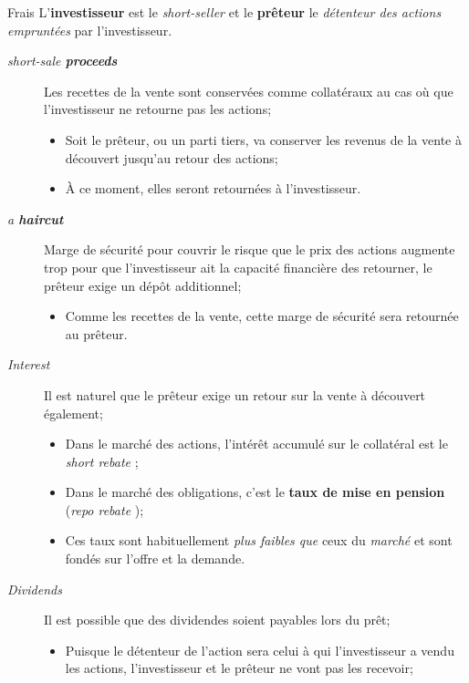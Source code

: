 \documentclass[10pt, french]{article}
\begin{document}
\begin{multicols*}{2}
\begin{conceptgen}{Frais}
L'\textbf{investisseur} est le \textit{short-seller} et le \textbf{prêteur} le \textit{détenteur des actions empruntées} par l'investisseur.

\begin{description}
	\item[\og \textit{short-sale \textbf{proceeds}} \fg{}]	Les recettes de la vente sont conservées comme collatéraux au cas où que l'investisseur ne retourne pas les actions;
		\begin{itemize}[leftmargin = *]
		\item	Soit le prêteur, ou un parti tiers, va conserver les revenus de la vente à découvert jusqu'au retour des actions;
		\item	À ce moment, elles seront retournées à l'investisseur.
		\end{itemize}
	\item[\og \textit{a \textbf{haircut}} \fg{}]	Marge de sécurité pour couvrir le risque que le prix des actions augmente trop pour que l'investisseur ait la capacité financière des retourner, le prêteur exige un \og dépôt \fg{} additionnel;
		\begin{itemize}[leftmargin = *]
		\item	Comme les recettes de la vente, cette marge de sécurité sera retournée au prêteur.
		\end{itemize}
	\item[\og \textit{Interest} \fg{}]	Il est naturel que le prêteur exige un retour sur la vente à découvert également;
		\begin{itemize}[leftmargin = *]
		\item	Dans le marché des actions, l'intérêt accumulé sur le collatéral est le \og \textit{short rebate} \fg{};
		\item	Dans le marché des obligations, c'est le \textbf{taux de mise en pension} (\og \textit{repo rebate} \fg{});
		\item	Ces taux sont habituellement \textit{plus faibles que} ceux du \textit{marché} et sont fondés sur l'offre et la demande.
		\end{itemize}
	\item[\og \textit{Dividends} \fg{}]	Il est possible que des dividendes soient payables lors du prêt;
		\begin{itemize}[leftmargin = *]
		\item	Puisque le détenteur de l'action sera celui à qui l'investisseur a vendu les actions, l'investisseur et le prêteur ne vont pas les recevoir;

\end{itemize}
\end{description}
\end{conceptgen}
\end{multicols*}
\end{document}
